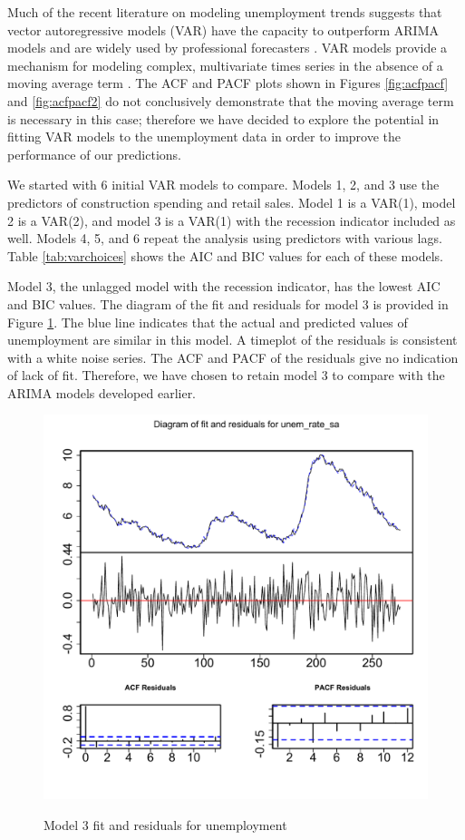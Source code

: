 \documentclass[twoside,twocolumn]{article}
\begin{document}
     Much of the recent literature on modeling unemployment trends suggests that vector autoregressive models (VAR) have the capacity to outperform ARIMA models and are widely used by professional forecasters \citep{Meyer2015, Tasci2015, Barnichon2016}. VAR models provide a mechanism for modeling complex, multivariate times series in the absence of a moving average term \citep{Chatfield2001} . The ACF and PACF plots shown in Figures \ref{fig:acfpacf} and \ref{fig:acfpacf2} do not conclusively demonstrate that the moving average term is necessary in this case; therefore we have decided to explore the potential in fitting VAR models to the unemployment data in order to improve the performance of our predictions.

We started  with 6 initial VAR models to compare. Models 1, 2, and 3 use the predictors of construction spending and retail sales. Model 1 is a VAR(1), model 2 is a VAR(2), and model 3 is a VAR(1) with the recession indicator included as well. Models 4, 5, and 6 repeat the analysis using predictors with various lags. Table \ref{tab:varchoices} shows the AIC and BIC values for each of these models.

Model 3, the unlagged model with the recession indicator, has the lowest AIC and BIC values.  The diagram of the fit and residuals for model 3 is provided in Figure \ref{fig:varfitmodel3}. The blue line indicates that the actual and predicted values of unemployment are similar in this model. A timeplot of the residuals is consistent with a white noise series. The ACF and PACF of the residuals give no indication of lack of fit. Therefore, we have chosen to retain model 3 to compare with the ARIMA models developed earlier.


   \begin{figure}[htb]
    	\centering
     	\caption{Model 3 fit and residuals for unemployment}
     	\includegraphics[width=\linewidth]{images/varfitmodel3}
     	\label{fig:varfitmodel3}
 \end{figure}
\end{document}
